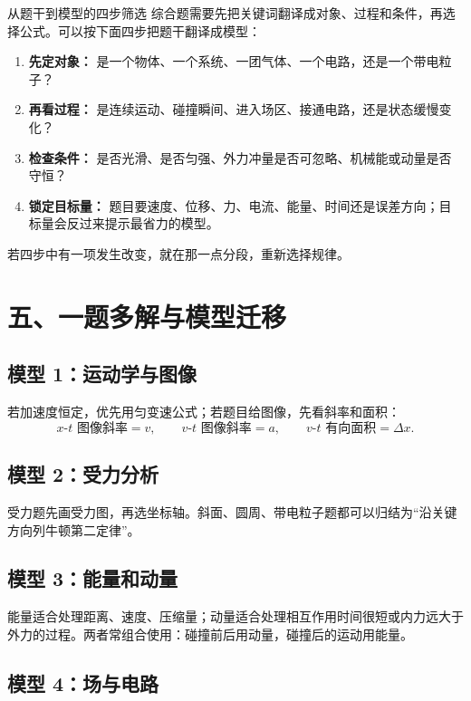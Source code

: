 \newpage
\begin{learningbox}{从题干到模型的四步筛选}
综合题需要先把关键词翻译成对象、过程和条件，再选择公式。可以按下面四步把题干翻译成模型：
\begin{enumerate}
  \item \textbf{先定对象：} 是一个物体、一个系统、一团气体、一个电路，还是一个带电粒子？
  \item \textbf{再看过程：} 是连续运动、碰撞瞬间、进入场区、接通电路，还是状态缓慢变化？
  \item \textbf{检查条件：} 是否光滑、是否匀强、外力冲量是否可忽略、机械能或动量是否守恒？
  \item \textbf{锁定目标量：} 题目要速度、位移、力、电流、能量、时间还是误差方向；目标量会反过来提示最省力的模型。
\end{enumerate}
若四步中有一项发生改变，就在那一点分段，重新选择规律。
\end{learningbox}

\section*{五、一题多解与模型迁移}

\subsection*{模型 1：运动学与图像}

若加速度恒定，优先用匀变速公式；若题目给图像，先看斜率和面积：
\[
x\text{-}t\text{ 图像斜率}=v,\qquad
v\text{-}t\text{ 图像斜率}=a,\qquad
v\text{-}t\text{ 有向面积}=\Delta x.
\]

\subsection*{模型 2：受力分析}

受力题先画受力图，再选坐标轴。斜面、圆周、带电粒子题都可以归结为“沿关键方向列牛顿第二定律”。

\subsection*{模型 3：能量和动量}

能量适合处理距离、速度、压缩量；动量适合处理相互作用时间很短或内力远大于外力的过程。两者常组合使用：碰撞前后用动量，碰撞后的运动用能量。

\subsection*{模型 4：场与电路}

